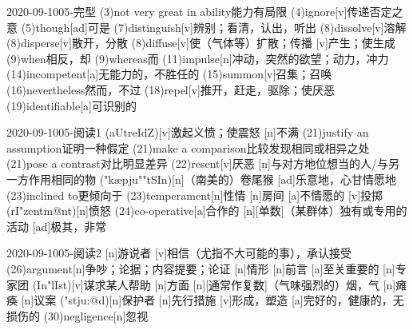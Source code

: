 \documentclass[12pt]{ctexart}
\begin{document}
\begin{wordlist}{2020-09-10}{05-完型}
  \word(3){not very great in ability}{能力有局限}
  \word(4){ignore}[v]{传递否定之意}
  \word(5){though}[ad]{可是}
  \word(7){distinguish}[v]{辨别；看清，认出，听出}
  \word(8){dissolve}[v]{溶解}
  \word(8){disperse}[v]{散开，分散}
  \word[2020-09-12](8){diffuse}[v]{使（气体等）扩散；传播}
  [v]{产生；使生成}
  \word(9){when}{相反，却}
  \word(9){whereas}{而}
  \word(11){impulse}[n]{冲动，突然的欲望；动力，冲力}
  \word(14){incompetent}[a]{无能力的，不胜任的}
  \word(15){summon}[v]{召集；召唤}
  \word(16){nevertheless}{然而，不过}
  \word[2020-09-12](18){repel}[v]{推开，赶走，驱除；使厌恶}
  \word(19){identifiable}[a]{可识别的}
\end{wordlist}
\begin{wordlist}{2020-09-10}{05-阅读1}
  (aUtreIdZ)[v]{激起义愤；使震怒}
  [n]{不满}
  \word(21){justify an assumption}{证明一种假定}
  \word(21){make a comparison}{比较发现相同或相异之处}
  \word(21){pose a contrast}{对比明显差异}
  \word[2020-09-12](22){resent}[v]{厌恶}
  [n]{与对方地位想当的人/与另一方作用相同的物}
  ("k\ae pju""tSIn)[n]{（南美的）卷尾猴}
  [ad]{乐意地，心甘情愿地}
  \word(23){inclined to}{更倾向于}
  \word[2020-09-12](23){temperament}[n]{性情}
  [n]{房间}
  [a]{不情愿的}
  [v]{投掷}
  (rI"zentm@nt)[n]{愤怒}
  \word(24){co-operative}[a]{合作的}
  [n]{[单数]（某群体）独有或专用的活动}
  [ad]{极其，非常}
\end{wordlist}
\begin{wordlist}{2020-09-10}{05-阅读2}
  [n]{游说者}
  [v]{相信（尤指不大可能的事），承认接受}
  \word(26){argument}[n]{争吵；论据；内容提要；论证}
  [n]{情形}
  [n]{前言}
  [a]{至关重要的}
  [n]{专家团}
  (In"lIst)[v]{谋求某人帮助}
  [n]{方面}
  [n]{[通常作复数]（气味强烈的）烟，气}
  [n]{瘫痪}
  [n]{议案}
  ("stju:@d)[n]{保护者}
  [n]{先行措施}
  [v]{形成，塑造}
  [a]{完好的，健康的，无损伤的}
  \word(30){negligence}[n]{忽视}
\end{wordlist}
\end{document}
